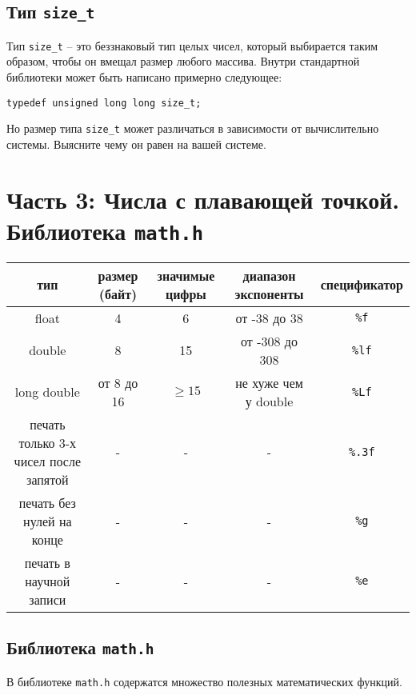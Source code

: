 \documentclass{article}
\begin{document}
\subsection*{Тип \texttt{size\_t}} 
Тип \texttt{size\_t} -- это беззнаковый тип целых чисел, который выбирается таким образом, чтобы он вмещал размер любого массива. Внутри стандартной библиотеки может быть написано примерно следующее:
\begin{lstlisting}
typedef unsigned long long size_t;
\end{lstlisting}
Но размер типа \texttt{size\_t} может различаться в зависимости от вычислительно системы. Выясните чему он равен на вашей системе.

\newpage
\section*{Часть 3: Числа с плавающей точкой. Библиотека \texttt{math.h}}
\begin{center}
\begin{tabular}{ c c c c c }
 тип & размер (байт) & значимые цифры & диапазон экспоненты & спецификатор \\ \hline
 float             & 4          & 6  & от -38 до 38    & \texttt{\%f} \\ 
 double            & 8          & 15 & от -308 до 308  & \texttt{\%lf}  \\  
 long double       & от 8 до 16 & $\ge 15$  & не хуже чем у double  & \texttt{\%Lf}  \\ \hline
 печать только 3-х чисел после запятой & -          & -  & -              & \texttt{\%.3f} \\
 печать без нулей на конце & -          & -  & -              & \texttt{\%g} \\
 печать в научной записи   & -          & -  & -              & \texttt{\%e} \\
\end{tabular}
\end{center}


\subsection*{Библиотека \texttt{math.h}}
В библиотеке \texttt{math.h} содержатся множество полезных математических функций.
\end{document}
